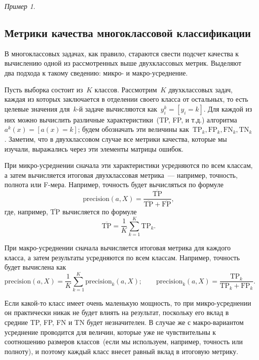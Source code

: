 \documentclass[a4paper, 12pt]{article}
\theoremstyle{plain} %
\theoremstyle{definition} %
\theoremstyle{remark} %
\newtheorem{example}{Пример}
\begin{document}
\begin{example}
\subsection{Метрики качества многоклассовой классификации}

В многоклассовых задачах, как правило, стараются свести подсчет качества
к вычислению одной из рассмотренных выше двухклассовых метрик.
Выделяют два подхода к такому сведению: микро- и макро-усреднение.

Пусть выборка состоит из~$K$ классов.
Рассмотрим~$K$ двухклассовых задач, каждая из которых заключается
в отделении своего класса от остальных, то есть целевые значения
для~$k$-й задаче вычисляются как~$y_i^k = [y_i = k]$.
Для каждой из них можно вычислить различные характеристики~(TP, FP, и т.д.)
алгоритма~$a^k(x) = [a(x) = k]$;
будем обозначать эти величины как~$\text{TP}_k, \text{FP}_k, \text{FN}_k, \text{TN}_k$.
Заметим, что в двухклассовом случае все метрики качества, которые мы изучали,
выражались через эти элементы матрицы ошибок.

При микро-усреднении сначала эти характеристики усредняются по всем классам,
а затем вычисляется итоговая двухклассовая метрика~--- например, точность, полнота или F-мера.
Например, точность будет вычисляться по формуле
\[
    \text{precision}(a, X)
    =
    \frac{
        \overline{\text{TP}}
    }{
        \overline{\text{TP}}
        +
        \overline{\text{FP}}
    },
\]
где, например, $\overline{\text{TP}}$ вычисляется по формуле
\[
    \overline{\text{TP}}
    =
    \frac{1}{K}
    \sum_{k = 1}^{K}
        \text{TP}_k.
\]

При макро-усреднении сначала вычисляется итоговая метрика для каждого класса, а затем результаты
усредняются по всем классам.
Например, точность будет вычислена как
\[
    \text{precision}(a, X)
    =
    \frac{1}{K}
    \sum_{k = 1}^{K}
        \text{precision}_k(a, X);
    \qquad
    \text{precision}_k(a, X)
    =
    \frac{
        \text{TP}_k
    }{
        \text{TP}_k
        +
        \text{FP}_k
    }.
\]

Если какой-то класс имеет очень маленькую мощность, то при микро-усреднении он практически никак не будет
влиять на результат, поскольку его вклад в средние TP, FP, FN и TN будет незначителен.
В случае же с макро-вариантом усреднение проводится для величин,
которые уже не чувствительны к соотношению размеров классов~(если мы используем, например, точность или полноту), и поэтому
каждый класс внесет равный вклад в итоговую метрику.


\end{example}
\end{document}
